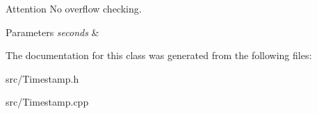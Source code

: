 \begin{DoxyAttention}{Attention}
No overflow checking. 
\end{DoxyAttention}

\begin{DoxyParams}{Parameters}
{\em seconds} & \\
\hline
\end{DoxyParams}


The documentation for this class was generated from the following files\+:\begin{DoxyCompactItemize}
\item 
src/Timestamp.\+h\item 
src/Timestamp.\+cpp\end{DoxyCompactItemize}
